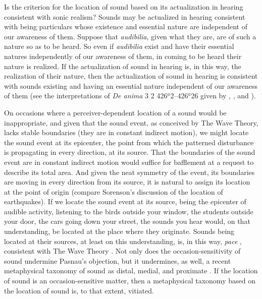 Is the criterion for the location of sound based on its actualization in hearing consistent with sonic realism? Sounds may be actualized in hearing consistent with being particulars whose existence and essential nature are independent of our awareness of them. Suppose that \emph{audibilia}, given what they are, are of such a nature so as to be heard. So even if \emph{audibilia} exist and have their essential natures independently of our awareness of them, in coming to be heard their nature is realized. If the actualization of sound in hearing is, in this way, the realization of their nature, then the actualization of sound in hearing is consistent with sounds existing and having an essential nature independent of our awareness of them (see the interpretations of \emph{De anima} 3 2 426\( ^{a} \)2--426\( ^{a} \)26 given by \citealt[29]{Burnyeat:1982mz}, \citealt{Ganson:1997fk}, and \citealt[84--88]{Kalderon:2015fr}). 

On occasions where a perceiver-dependent location of a sound would be inappropriate, and given that the sound event, as conceived by The Wave Theory, lacks stable boundaries (they are in constant indirect motion), we might locate the sound event at its epicenter, the point from which the patterned disturbance is propagating in every direction, at its source. That the boundaries of the sound event are in constant indirect motion would suffice for bafflement at a request to describe its total area. And given the neat symmetry of the event, its boundaries are moving in every direction from its source, it is natural to assign its location at the point of origin (compare Sorenson's \citeyear[138--9]{Sorensen:2009aa} discussion of the location of earthquakes). If we locate the sound event at its source, being the epicenter of audible activity, listening to the birds outside your window, the students outside your door, the cars going down your street, the sounds you hear would, on that understanding, be located at the place where they originate. Sounds being located at their sources, at least on this understanding, is, in this way, \emph{pace} \citet{Pasnau:1999ss}, consistent with The Wave Theory \citep[see][123, for a partial anticipation of this point]{OShaughnessy:2009aa}. Not only does the occasion-sensitivity of sound undermine Pasnau's objection, but it undermines, as well, a recent metaphysical taxonomy of sound as distal, medial, and proximate \citep{Casati:2014hw}. If the location of sound is an occasion-sensitive matter, then a metaphysical taxonomy based on the location of sound is, to that extent, vitiated.

